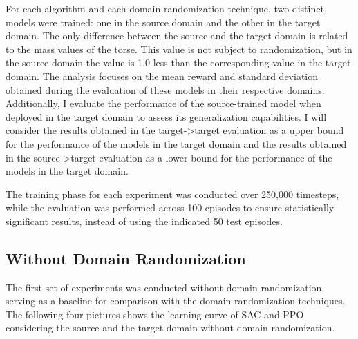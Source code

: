 \documentclass[11pt]{article}
\begin{document}
For each algorithm and each domain randomization technique, two distinct models were trained: one in the source domain and the other in the target domain. The only difference between the source and the target domain is related to the mass values of the torse. This value is not subject to randomization, but in the source domain the value is 1.0 less than the corresponding value in the target domain. 
The analysis focuses on the mean reward and standard deviation obtained during the evaluation of these models in their respective domains. Additionally, I evaluate the performance of the source-trained model when deployed in the target domain to assess its generalization capabilities. I will consider the results obtained in the target->target evaluation as a upper bound for the performance of the models in the target domain and the results obtained in the source->target evaluation as a lower bound for the performance of the models in the target domain. 

The training phase for each experiment was conducted over 250,000 timesteps, while the evaluation was performed across 100 episodes to ensure statistically significant results, instead of using the indicated 50 test episodes.

\subsection{Without Domain Randomization}

The first set of experiments was conducted without domain randomization, serving as a baseline for comparison with the domain randomization techniques. The following four pictures shows the learning curve of SAC and PPO considering the source and the target domain without domain randomization.
\end{document}
